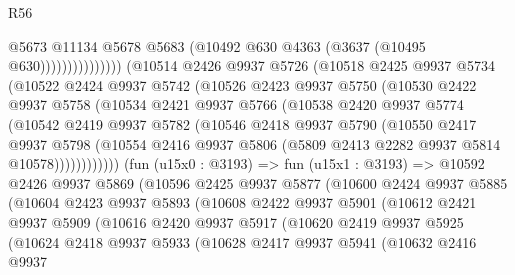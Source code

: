 \begin{lexlean}{R56}
\begin{coremodule}
                                @5673
                                @11134
                                @5678
                                @5683
                                (@10492 @630 @4363 (@3637 (@10495 @630)))))))))))))))
        (@10514
          @2426
          @9937
          @5726
          (@10518
            @2425
            @9937
            @5734
            (@10522
              @2424
              @9937
              @5742
              (@10526
                @2423
                @9937
                @5750
                (@10530
                  @2422
                  @9937
                  @5758
                  (@10534
                    @2421
                    @9937
                    @5766
                    (@10538
                      @2420
                      @9937
                      @5774
                      (@10542
                        @2419
                        @9937
                        @5782
                        (@10546
                          @2418
                          @9937
                          @5790
                          (@10550
                            @2417
                            @9937
                            @5798
                            (@10554
                              @2416
                              @9937
                              @5806
                              (@5809 @2413 @2282 @9937 @5814 @10578))))))))))))
        (fun (u15x0 : @3193) =>
        fun (u15x1 : @3193) =>
        @10592
          @2426
          @9937
          @5869
          (@10596
            @2425
            @9937
            @5877
            (@10600
              @2424
              @9937
              @5885
              (@10604
                @2423
                @9937
                @5893
                (@10608
                  @2422
                  @9937
                  @5901
                  (@10612
                    @2421
                    @9937
                    @5909
                    (@10616
                      @2420
                      @9937
                      @5917
                      (@10620
                        @2419
                        @9937
                        @5925
                        (@10624
                          @2418
                          @9937
                          @5933
                          (@10628
                            @2417
                            @9937
                            @5941
                            (@10632
                              @2416
                              @9937

\end{coremodule}
\end{lexlean}
